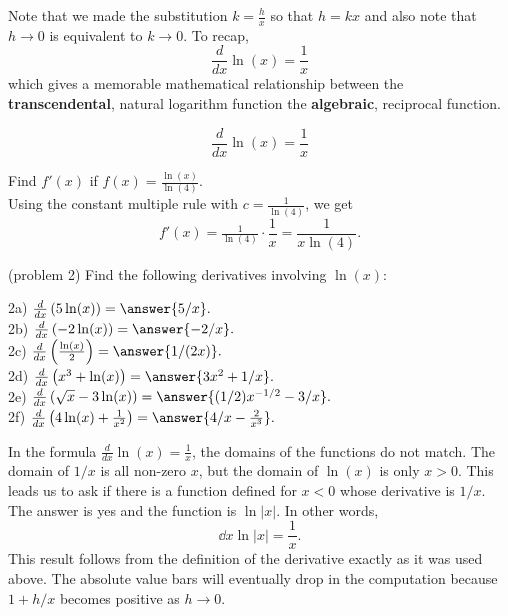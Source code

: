 \documentclass{ximera}
\begin{document}
Note that we made the substitution $k =\frac{h}{x}$ so that $h = kx$ and  also note 
that $h\to 0$ is equivalent to $k\to 0$.
To recap, 
\[
\frac{d}{dx} \ln(x) = \frac{1}{x}
\]
which gives a memorable mathematical relationship between the \textbf{transcendental}, natural logarithm function 
the \textbf{algebraic}, reciprocal function.



\begin{proposition}
\[
\frac{d}{dx} \ln(x) = \frac{1}{x}
\]
\end{proposition}



\begin{example}[example 2]
 Find $f'(x)$ if $f(x) = \frac{\ln(x)}{\ln(4)}$.\\
 Using the constant multiple rule with $c = \frac{1}{\ln(4)}$, 
 we get 
\[
f'(x) = \tfrac{1}{\ln(4)} \cdot \frac{1}{x} = \frac{1}{x\ln(4)}.
\]
\end{example}



\begin{problem}(problem 2)
Find the following derivatives involving $\ln(x)$:

2a) $\frac{d}{dx} \left(5\ln(x)\right) = \answer{5/x}.$\\
2b) $\frac{d}{dx} \left(-2\ln(x)\right) = \answer{-2/x}.$\\
2c) $\frac{d}{dx} \left(\frac{\ln(x)}{2}\right) = \answer{1/(2x)}.$\\
2d) $\frac{d}{dx} \left(x^3 + \ln(x)\right) = \answer{3x^2 + 1/x}.$\\
2e) $\frac{d}{dx} \left(\sqrt x - 3\ln(x)\right) = \answer{(1/2)x^{-1/2} - 3/x}.$\\
2f) $\frac{d}{dx} \left(4\ln(x) + \frac{1}{x^2}\right) = \answer{4/x -\frac{2}{x^3}}.$


\end{problem}





In the formula $\tfrac{d}{dx} \ln(x) = \tfrac{1}{x}$, the domains of the functions do not match.  
The domain of $1/x$ is all non-zero $x$, but the domain of 
$\ln(x)$  is only $x >0$.  This leads us to ask if there is a function defined for $x<0$ whose derivative is $1/x$. 
The answer is yes and the function is 
$\ln|x|$. In other words,
\[
\dd{x} \ln|x| = \frac{1}{x}.
\]
This result follows from the definition of the derivative exactly as it was used above.  
The absolute value bars will eventually drop in the computation because $1+h/x$ becomes positive as $h \to 0$.
 
\end{document}

